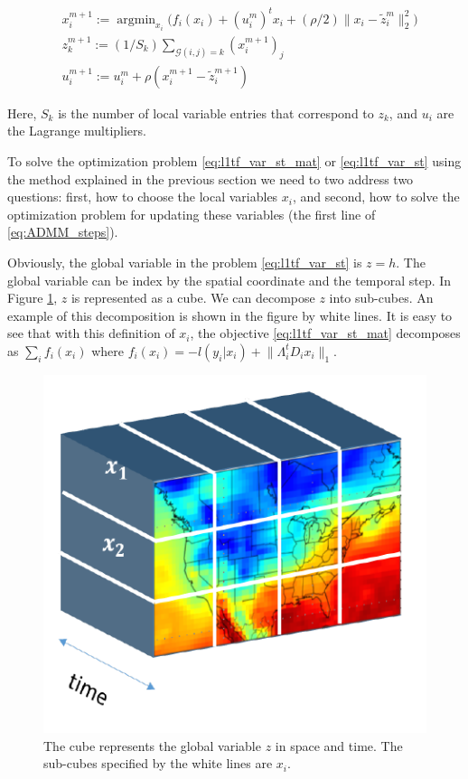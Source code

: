 \documentclass[review]{elsarticle}
\DeclareMathOperator*{\argmin}{argmin}
\begin{document}
\begin{equation}
\begin{aligned}
& x_i^{m+1}:=\argmin_{x_i} \bigg( f_i(x_i) + (u_i^m)^t x_i + (\rho/2) \lVert x_i-\tilde{z}_i^m \lVert_2^2\bigg)\\
& z_k^{m+1}:=(1/S_k)\sum_{\mathscr{G}(i,j)=k} (x_i^{m+1})_j\\
& u_i^{m+1}:=u_i^m + \rho (x_i^{m+1}-\tilde{z}_i^{m+1})
\end{aligned}
\label{eq:ADMM_steps}
\end{equation}

Here, $S_k$ is the number of local variable entries that correspond to $z_k$, and $u_i$ are the Lagrange multipliers. 

To solve the optimization problem \ref{eq:l1tf_var_st_mat} or \ref{eq:l1tf_var_st} using the method explained in the previous section we need to two address two questions: first, how to choose the local variables $x_i$, and second, how to solve the optimization problem for updating these variables (the first line of \ref{eq:ADMM_steps}). 

Obviously, the global variable in the problem \ref{eq:l1tf_var_st} is $z=h$. The global variable can be index by the spatial coordinate and the temporal step. In Figure \ref{fig:data_cube}, $z$ is represented as a cube. We can decompose $z$ into sub-cubes. An example of this decomposition is shown in the figure by white lines. It is easy to see that with this definition of $x_i$, the objective \ref{eq:l1tf_var_st_mat} decomposes as $\sum_i f_i(x_i)$ where $f_i(x_i)=-l(y_i|x_i)+\lVert \Lambda_i^t D_ix_i \lVert_1$. 


\begin{figure}[ht]
	\vskip 0.2in
	\begin{center}
		\centerline{\includegraphics[width=.5\columnwidth]{Figures/data_cube}}
		\caption{The cube represents the global variable $z$ in space and time. The sub-cubes specified by the white lines are $x_i$.}
		\label{fig:data_cube}
	\end{center}
	\vskip -0.2in
\end{figure} 
\end{document}
